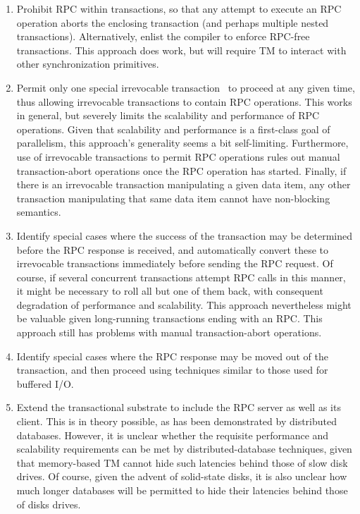\begin{enumerate}
\item	Prohibit RPC within transactions, so that any attempt to execute
	an RPC operation aborts the enclosing transaction (and perhaps
	multiple nested transactions).
	Alternatively, enlist the compiler to enforce RPC-free
	transactions.
	This approach does work, but will require TM to
	interact with other synchronization primitives.
\item	Permit only one special
	irrevocable transaction~\cite{SpearMichaelScott2008InevitableSTM}
	to proceed at any given time, thus allowing irrevocable
	transactions to contain RPC operations.
	This works in general, but severely limits the scalability and
	performance of RPC operations.
	Given that scalability and performance is a first-class goal of
	parallelism, this approach's generality seems a bit self-limiting.
	Furthermore, use of irrevocable transactions to permit RPC
	operations rules out manual transaction-abort operations
	once the RPC operation has started.
	Finally, if there is an irrevocable transaction manipulating
	a given data item, any other transaction manipulating that
	same data item cannot have non-blocking semantics.
\item	Identify special cases where the success of the transaction may
	be determined before the RPC response is received, and
	automatically convert these to irrevocable transactions immediately
	before sending the RPC request.
	Of course, if several concurrent transactions attempt RPC calls
	in this manner, it might be necessary to roll all but one of them
	back, with consequent degradation of performance and scalability.
	This approach nevertheless might be valuable given long-running
	transactions ending with an RPC.
	This approach still has problems with manual transaction-abort
	operations.
\item	Identify special cases where the RPC response may be moved out
	of the transaction, and then proceed using techniques similar
	to those used for buffered I/O.
\item	Extend the transactional substrate to include the RPC server as
	well as its client.
	This is in theory possible, as has been demonstrated by
	distributed databases.
	However, it is unclear whether the requisite performance and
	scalability requirements can be met by distributed-database
	techniques, given that memory-based TM cannot hide such latencies
	behind those of slow disk drives.
	Of course, given the advent of solid-state disks, it is also unclear
	how much longer databases will be permitted to hide their latencies
	behind those of disks drives.
\end{enumerate}

